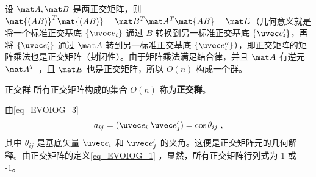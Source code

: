 设 $\mat A,\mat B$ 是两正交矩阵，则 $\mat{(AB)}^T\mat{(AB)}=\mat B^T\mat A^T\mat{AB}=\mat E$（几何意义就是将一个标准正交基底 $\{ \uvec e_i\}$ 通过 $B$ 转换到另一标准正交基底 $\{\uvec e'_i\}$，再将 $\{\uvec e'_i\}$ 通过 $\mat A$ 转到另一标准正交基底 $\{\uvec e''_i\}$），即正交矩阵的矩阵乘法也是正交矩阵（封闭性）。由于矩阵乘法满足结合律，并且 $\mat A$ 有逆元 $\mat A^T$ ，且 $\mat E$ 也是正交矩阵，所以 $O(n)$ 构成一个群。
\begin{definition}{正交群}
所有正交矩阵构成的集合 $O(n)$ 称为\textbf{正交群}。
\end{definition}

由\autoref{eq_EVOIOG_3} 
\begin{equation}
a_{ij}=(\uvec e_i|\uvec e'_j)=\cos{\theta_{ij}}~,
\end{equation}
其中 $\theta_{ij}$ 是基底矢量 $\uvec e_i$ 和 $\uvec e'_j$ 的夹角。这便是正交矩阵元的几何解释。由正交矩阵的定义\autoref{eq_EVOIOG_1} ，显然，所有正交矩阵行列式为 1 或 -1。
